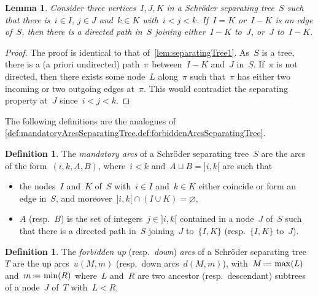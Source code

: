\documentclass{amsart}
\newtheorem{lemma}[theorem]{Lemma}
\theoremstyle{definition}
\newtheorem{definition}[theorem]{Definition}
\newcommand{\eqdef}{\mbox{\,\raisebox{0.2ex}{\scriptsize\ensuremath{\mathrm:}}\ensuremath{=}\,}} %
\newcommand{\darkblue}{\color{darkblue}} %
\newcommand{\defn}[1]{\textsl{\darkblue #1}} %
\begin{document}
\begin{lemma}
\label{lem:SchroderSeparatingTree1}
Consider three vertices~$I,J,K$ in a Schröder separating tree~$S$ such that there is~$i \in I$, $j \in J$ and~$k \in K$ with~$i < j < k$.
If~$I = K$ or~$I - K$ is an edge of~$S$, then there is a directed path in~$S$ joining either~$I-K$ to~$J$, or~$J$ to~$I-K$.
\end{lemma}

\begin{proof}
The proof is identical to that of~\cref{lem:separatingTree1}.
As~$S$ is a tree, there is a (a priori undirected) path~$\pi$ between~$I-K$ and~$J$ in~$S$.
If~$\pi$ is not directed, then there exists some node~$L$ along~$\pi$ such that~$\pi$ has either two incoming or two outgoing edges at~$\pi$.
This would contradict the separating property at~$J$ since~$i < j < k$.
\end{proof}

The following  definitions are the analogues of \cref{def:mandatoryArcsSeparatingTree,def:forbiddenArcsSeparatingTree}.

\begin{definition}
\label{def:mandatoryArcsSchroderSeparatingTree}
The \defn{mandatory arcs} of a Schröder separating tree~$S$ are the arcs of the form~$(i, k, A, B)$, where~$i < k$ and~$A \sqcup B = {]i,k[}$ are such that
\begin{itemize}
\item the nodes~$I$ and~$K$ of~$S$ with~$i \in I$ and~$k \in K$ either coincide or form an edge in~$S$, and moreover~${]i,k[} \cap (I \cup K) = \varnothing$, 
\item $A$ (resp.~$B$) is the set of integers~$j \in {]i,k[}$ contained in a node~$J$ of~$S$ such that there is a directed path in~$S$ joining~$J$ to~$\{I,K\}$ (resp.~$\{I,K\}$ to~$J$).
\end{itemize}
\end{definition}

\begin{definition}
\label{def:forbiddenArcsSchroderSeparatingTree}
The \defn{forbidden up} (resp.~\defn{down}) \defn{arcs} of a Schröder separating tree~$T$ are the up arcs~$u(M, m)$ (resp.~down arcs~$d(M, m)$), with~$M \eqdef \max(L)$ and~$m \eqdef \min(R)$ where~$L$ and~$R$ are two ancestor (resp.~descendant) subtrees of a node~$J$ of~$T$ with~$L < R$.
\end{definition}
\end{document}
